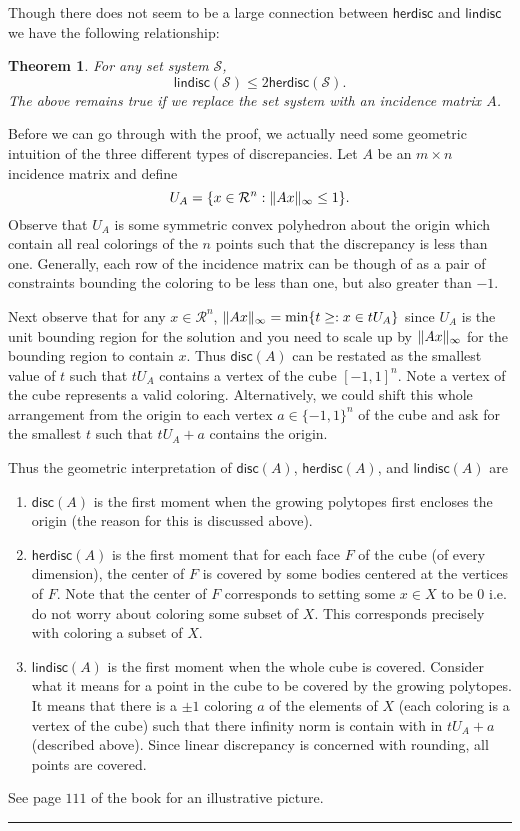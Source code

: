 \documentclass[twoside]{article}
\newcounter{lecnum}
\newtheorem{theorem}{Theorem}[lecnum]
\newenvironment{proof}{{\bf Proof:}}{\hfill\rule{2mm}{2mm}}
\newcommand\R{\mathcal{R}}
\newcommand\disc{\mathsf{disc}}
\newcommand\SSet{\mathcal{S}}
\newcommand\herdisc{\mathsf{herdisc}}
\newcommand\lindisc{\mathsf{lindisc}}
\DeclarePairedDelimiter\norm{\parallel}{\parallel}
\begin{document}
Though there does not seem to be a large connection between $\herdisc$ and $\lindisc$ we have the following relationship:
\begin{theorem}
For any set system $\SSet$, 
\[\lindisc(\SSet) \leq 2\herdisc(\SSet).\]
The above remains true if we replace the set system with an incidence matrix $A$.
\end{theorem}
\begin{proof}
Before we can go through with the proof, we actually need some geometric intuition of the three different types of discrepancies. Let $A$ be an $m \times n$ incidence matrix and define 
\[U_{A} = \{x \in \R^n: \norm{Ax}_{\infty} \leq 1\}.\]
Observe that $U_A$ is some symmetric convex polyhedron about the origin which contain all real colorings of the $n$ points such that the discrepancy is less than one. Generally, each row of the incidence matrix can be though of as a pair of constraints bounding the coloring to be less than one, but also greater than $-1$.

Next observe that for any $x \in \R^n$, $\norm{Ax}_{\infty} = \min\{t \geq: x \in tU_A\}$ since $U_A$ is the unit bounding region for the solution and you need to scale up by $\norm{Ax}_{\infty}$ for the bounding region to contain $x$. Thus $\disc(A)$ can be restated as the smallest value of $t$ such that $tU_A$ contains a vertex of the cube $[-1, 1]^n$. Note a vertex of the cube represents a valid coloring. Alternatively, we could shift this whole arrangement from the origin to each vertex $a \in \{-1, 1\}^n$ of the cube and ask for the smallest $t$ such that $tU_A + a$ contains the origin.

Thus the geometric interpretation of $\disc(A)$, $\herdisc(A)$, and $\lindisc(A)$ are
\begin{enumerate}
\item $\disc(A)$ is the first moment when the growing polytopes first encloses the origin (the reason for this is discussed above).
\item $\herdisc(A)$ is the first moment that for each face $F$ of the cube (of every dimension), the center of $F$ is covered by some bodies centered at the vertices of $F$. Note that the center of $F$ corresponds to setting some $x \in X$ to be $0$ i.e. do not worry about coloring some subset of $X$. This corresponds precisely with coloring a subset of $X$. 
\item $\lindisc(A)$ is the first moment when the whole cube is covered. Consider what it means for a point in the cube to be covered by the growing polytopes. It means that there is a $\pm 1$ coloring $a$ of the elements of $X$ (each coloring is a vertex of the cube) such that there infinity norm is contain with in $tU_A + a$ (described above). Since linear discrepancy is concerned with rounding, all points are covered. 
\end{enumerate}
See page $111$ of the book for an illustrative picture.


\end{proof}
\end{document}
